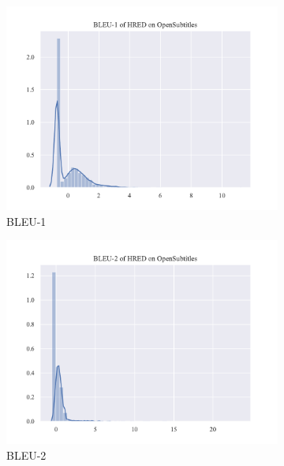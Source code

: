 \begin{figure}[H]
    \begin{subfigure}{0.4\linewidth}
        \centering
        \includegraphics[width=\linewidth]{figure/distplot/opensub/hred/bleu_1/plot.pdf}
        \caption{BLEU-1}
    \end{subfigure}%
    \begin{subfigure}{0.4\linewidth}
        \centering
        \includegraphics[width=\linewidth]{figure/distplot/opensub/hred/bleu_2/plot.pdf}
        \caption{BLEU-2}
    \end{subfigure}
    \begin{subfigure}{0.4\linewidth}
        \centering

\end{subfigure}
\end{figure}
